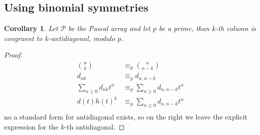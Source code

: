 \documentclass[11pt,a4paper]{article} %
\newtheorem{corollary}[theorem]{Corollary}
\begin{document}
    \subsection{Using binomial symmetries}

    \begin{corollary}
    Let $\mathcal{P}$ be the Pascal array and let $p$ be a prime, than $k$-th column 
    is congruent to $k$-antidiagonal, modulo $p$.
    \end{corollary}
    \begin{proof}
        \begin{displaymath}
            \begin{split}
                { {n} \choose {k} } &\equiv_{p} { {n} \choose {n-k} } \\
                d_{nk} &\equiv_{p} d_{n,n-k}\\
                \sum_{n\geq 0}{d_{nk} t^n} &\equiv_{p}\sum_{n\geq 0}{d_{n,n-k} t^n} \\
                d(t)h(t)^k &\equiv_{p}\sum_{n\geq 0}{d_{n,n-k} t^n} \\
            \end{split}
        \end{displaymath}
    no a standard form for antidiagonal exists, so on the right we leave the explicit
    expression for the $k$-th antidiagonal.
    \end{proof}
\end{document}
